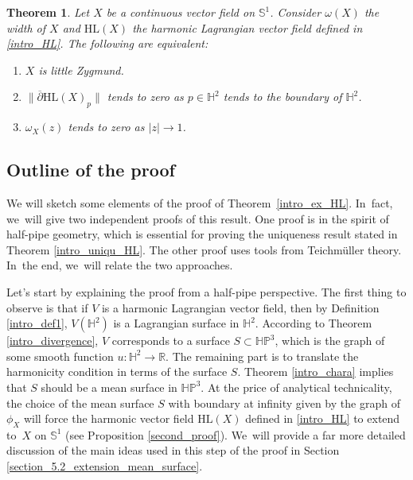 \documentclass[11pt]{article}
\theoremstyle{plain}
\newtheorem{theorem}[cor]{Theorem}
\theoremstyle{definition}
\newcommand{\HP}{\mathbb{HP}^3}
\begin{document}
\begin{theorem}\label{Intro_chara_little}
Let $X$ be a continuous vector field on $\mathbb{S}^1$. Consider $\omega(X)$ the width of $X$ and $\mathrm{HL}(X)$ the harmonic Lagrangian vector field defined in \eqref{intro_HL}. The following are equivalent:
\begin{enumerate}
\item $X$ is little Zygmund.
\item $\lVert \overline{\partial} \mathrm{HL}(X)_p\rVert$ tends to zero as $p \in \mathbb{H}^2$ tends to the boundary of $\mathbb{H}^2$.
\item $\omega_X(z)$ tends to zero as $\lvert z \rvert \to 1$.
\end{enumerate}
\end{theorem}

\subsection{Outline of the proof}\label{outline_of_the_proof}

We will sketch some elements of the proof of Theorem~\ref{intro_ex_HL}. In~fact, we~will give two independent proofs of this result. One proof is in the spirit of half-pipe geometry, which is essential for proving the uniqueness result stated in Theorem \ref{intro_uniqu_HL}. The other proof uses tools from Teichmüller theory. In~the end, we~will relate the two approaches.

Let's start by explaining the proof from a half-pipe perspective. The first thing to observe is that if \(V \) is a harmonic Lagrangian vector field, then by Definition \ref{intro_def1}, \(V(\mathbb{H}^2) \) is a Lagrangian surface in \(\mathbb{H}^2 \). According to Theorem \ref{intro_divergence}, \(V \) corresponds to a surface \(S \subset \HP \), which is the graph of some smooth function \(u: \mathbb{H}^2 \to \mathbb{R} \). The remaining part is to translate the harmonicity condition in terms of the surface \(S \). Theorem \ref{intro_chara} implies that \(S \) should be a mean surface in \(\HP\). At the price of analytical technicality, the choice of the mean surface \(S \) with boundary at infinity given by the graph of \(\phi_X \) will force the harmonic vector field \(\mathrm{HL}(X)\) defined in \eqref{intro_HL} to extend to~\(X \) on \(\mathbb{S}^1\) (see Proposition \ref{second_proof}). We~will provide a far more detailed discussion of the main ideas used in this step of the proof in Section \ref{section_5.2_extension_mean_surface}.
\end{document}

